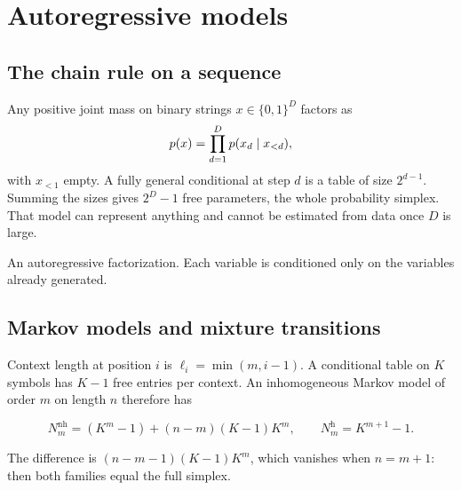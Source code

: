 \chapter{Autoregressive models}
\label{ch:ar}

\section{The chain rule on a sequence}

Any positive joint mass on binary strings $x\in\{0,1\}^D$ factors as
\[
p(x)=\prod_{d=1}^D p(x_d\mid x_{<d}),
\]
with $x_{<1}$ empty. A fully general conditional at step $d$ is a table of size $2^{d-1}$. Summing the sizes gives $2^D-1$ free parameters, the whole probability simplex. That model can represent anything and cannot be estimated from data once $D$ is large.

\begin{center}
\end{center}
\begin{center}
\textcolor{muted}{\small An autoregressive factorization. Each variable is conditioned only on the variables already generated.}
\end{center}

\section{Markov models and mixture transitions}

Context length at position $i$ is $\ell_i=\min(m,i-1)$. A conditional table on $K$ symbols has $K-1$ free entries per context. An inhomogeneous Markov model of order $m$ on length $n$ therefore has
\begin{resultbox}
\[
N_m^{\mathrm{nh}}
=(K^m-1)+(n-m)(K-1)K^m,\qquad
N_m^{\mathrm{h}}=K^{m+1}-1.
\]
\end{resultbox}
The difference is $(n-m-1)(K-1)K^m$, which vanishes when $n=m+1$: then both families equal the full simplex.

